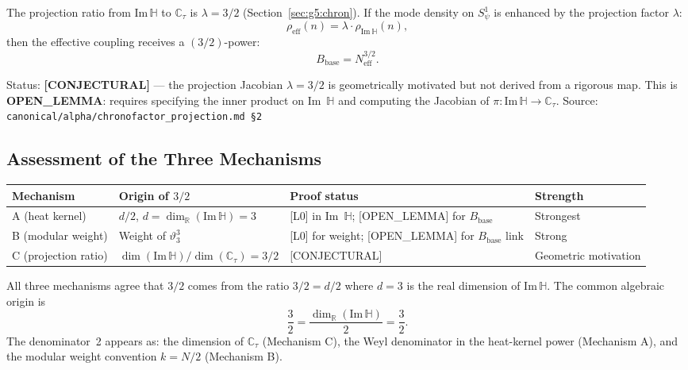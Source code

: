 \documentclass[12pt,a4paper]{article}
\theoremstyle{definition}
\theoremstyle{remark}
\begin{document}
The projection ratio from $\mathrm{Im}\,\mathbb{H}$ to $\mathbb{C}_\tau$ is
$\lambda = 3/2$ (Section~\ref{sec:g5:chron}).  If the mode density on $S^1_\psi$
is enhanced by the projection factor $\lambda$:
\begin{equation}
  \rho_\mathrm{eff}(n) = \lambda \cdot \rho_{\mathrm{Im}\,\mathbb{H}}(n),
  \label{eq:g5:rho_eff}
\end{equation}
then the effective coupling receives a $(3/2)$-power:
\begin{equation}
  B_\mathrm{base} = N_\mathrm{eff}^{3/2}.
  \label{eq:g5:Bbase_proj}
\end{equation}

\begin{statusbox}
Status: \textbf{[CONJECTURAL]} — the projection Jacobian $\lambda = 3/2$ is
geometrically motivated but not derived from a rigorous map.
This is \textbf{OPEN\_LEMMA}: requires specifying the inner product on Im~$\mathbb{H}$
and computing the Jacobian of $\pi: \mathrm{Im}\,\mathbb{H} \to \mathbb{C}_\tau$.
Source: \texttt{canonical/alpha/chronofactor\_projection.md \S2}
\end{statusbox}

\subsection{Assessment of the Three Mechanisms}
\label{sec:g5:assess}

\begin{center}
\begin{tabular}{llll}
\toprule
Mechanism & Origin of $3/2$ & Proof status & Strength \\
\midrule
A (heat kernel) & $d/2$, $d = \dim_\mathbb{R}(\mathrm{Im}\,\mathbb{H}) = 3$ & [L0] in Im~$\mathbb{H}$; [OPEN\_LEMMA] for $B_\mathrm{base}$ & Strongest \\
B (modular weight) & Weight of $\vartheta_3^3$ & [L0] for weight; [OPEN\_LEMMA] for $B_\mathrm{base}$ link & Strong \\
C (projection ratio) & $\dim(\mathrm{Im}\,\mathbb{H})/\dim(\mathbb{C}_\tau) = 3/2$ & [CONJECTURAL] & Geometric motivation \\
\bottomrule
\end{tabular}
\end{center}

All three mechanisms agree that $3/2$ comes from the ratio $3/2 = d/2$ where $d = 3$
is the real dimension of $\mathrm{Im}\,\mathbb{H}$.  The common algebraic origin is
\begin{equation}
  \boxed{\frac{3}{2} = \frac{\dim_\mathbb{R}(\mathrm{Im}\,\mathbb{H})}{2} = \frac{3}{2}.}
  \label{eq:g5:32_origin}
\end{equation}
The denominator~2 appears as: the dimension of $\mathbb{C}_\tau$ (Mechanism C),
the Weyl denominator in the heat-kernel power (Mechanism A), and the modular
weight convention $k = N/2$ (Mechanism B).
\end{document}
